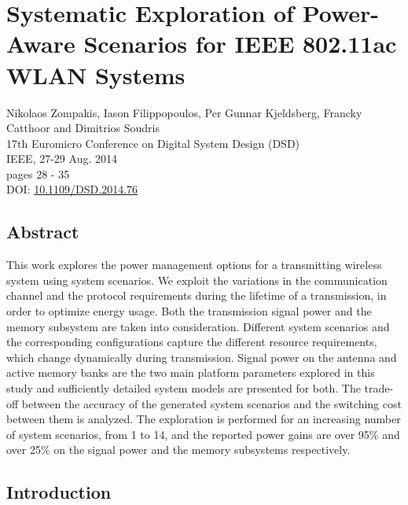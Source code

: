 \chapter{Systematic Exploration of Power-Aware Scenarios for IEEE 802.11ac WLAN Systems}
\label{dsd}

\begin{center}
Nikolaos Zompakis, Iason Filippopoulos, Per Gunnar Kjeldsberg, Francky Catthoor and Dimitrios Soudris
\\
17th Euromicro Conference on Digital System Design (DSD) 
\\
IEEE, 27-29 Aug. 2014
\\
pages 28 - 35
\\
DOI: 
\href{http://dx.doi.org/10.1109/DSD.2014.76}{10.1109/DSD.2014.76}
\end{center}
\afterpage{\null\newpage}
\newpage

\vspace*{\fill}
\section*{\hspace*{\fill} Abstract \hspace*{\fill}}
This work explores the power management options for a transmitting wireless system using system scenarios. We exploit the variations in the communication channel and the protocol requirements during the lifetime of a transmission, in order to optimize energy usage. Both the transmission signal power and the memory subsystem are taken into consideration. Different system scenarios and the corresponding configurations capture the different resource requirements, which change dynamically during transmission. Signal power on the antenna and active memory banks are the two main platform parameters explored in this study and sufficiently detailed system models are presented for both. The trade-off between the accuracy of the generated system scenarios and the switching cost between them is analyzed. The exploration is performed for an increasing number of system scenarios, from 1 to 14, and the reported power gains are over 95\% and over 25\% on the signal power and the memory subsystems respectively.
\vspace*{\fill}
\afterpage{\null\newpage}
\newpage

\section{Introduction}

